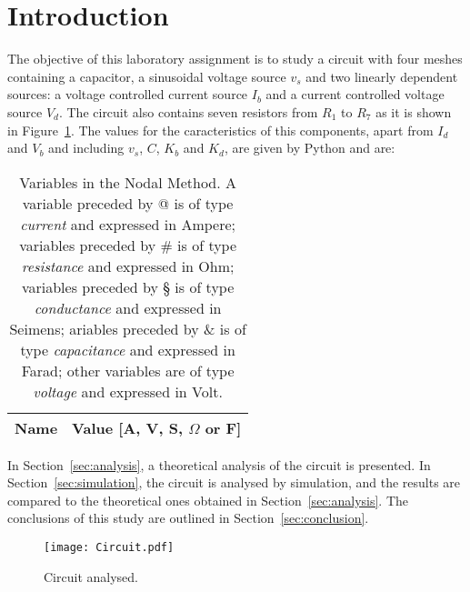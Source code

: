 \section{Introduction}
\label{sec:introduction}

The objective of this laboratory assignment is to study a circuit with four meshes containing a capacitor, a sinusoidal voltage source $v_s$ and two linearly dependent sources: a voltage controlled current source $I_b$ and a current controlled voltage source $V_d$. The circuit also contains seven resistors from $R_1$ to $R_7$ as it is shown in Figure~\ref{fig:Circuit_Base}.
The values for the caracteristics of this components, apart from $I_d$ and $V_b$ and including $v_s$, $C$, $K_b$ and $K_d$, are given by Python and are:

\begin{table}[h]
  \centering
 \begin{tabular}{|l|r|}
    \hline    
    {\bf Name} & {\bf Value [A, V, S, $\Omega$ or F]} \\ \hline
    
  \end{tabular}
  \caption{Variables in the Nodal Method. A variable preceded by @ is of type {\em current} and expressed in Ampere; variables preceded by \# is of type {\em resistance} and expressed in Ohm; variables preceded by § is of type {\em conductance} and expressed in Seimens; ariables preceded by \& is of type {\em capacitance} and expressed in Farad; other variables are of type {\em voltage} and expressed in Volt.}
  \label{tab:Enunciado}
\end{table}

In Section~\ref{sec:analysis}, a theoretical analysis of the circuit is
presented. In Section~\ref{sec:simulation}, the circuit is analysed by
simulation, and the results are compared to the theoretical ones obtained in
Section~\ref{sec:analysis}. The conclusions of this study are outlined in
Section~\ref{sec:conclusion}.

\begin{figure}[h] \centering
\texttt{[image: Circuit.pdf]}
\caption{Circuit analysed.}
\label{fig:Circuit_Base}
\end{figure}